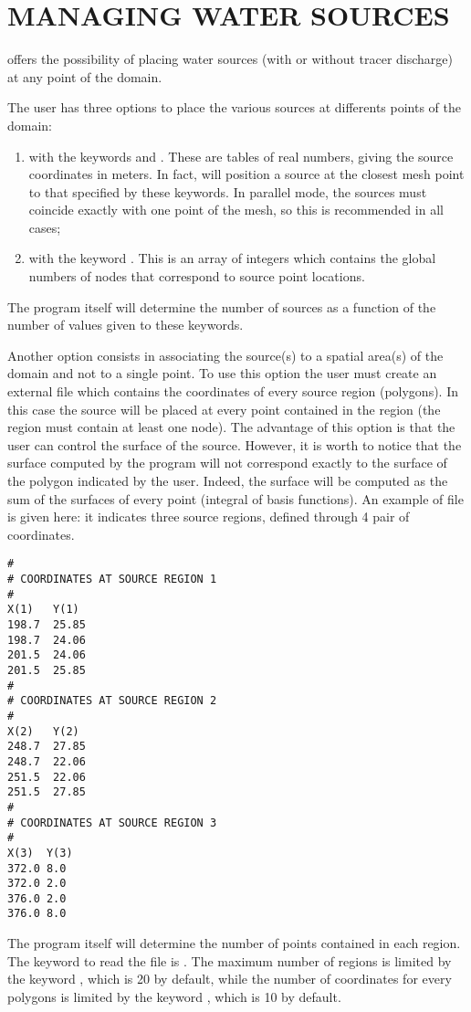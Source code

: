\chapter{MANAGING WATER SOURCES}
\label{ch:manag:ws}
 offers the possibility of placing water sources (with or without
tracer discharge) at any point of the domain.

The user has three options to place the various sources at differents points
of the domain:
\begin{enumerate}
\item with the keywords  and
.
These are tables of real numbers,
giving the source coordinates in meters. In fact,  will position a
source at the closest mesh point to that specified by these keywords.
In parallel mode, the sources must coincide exactly with one point of the mesh,
so this is recommended in all cases;
\item with the keyword . This is an
array of integers which contains the global numbers of nodes that correspond
 to source point locations.
\end{enumerate}
The program itself will determine the number of sources as a function of the
number of values given to these keywords.

Another option consists in associating the source(s) to a spatial area(s) of the
domain and not to a single point.
To use this option the user must create an external file which contains the coordinates
of every source region (polygons).
In this case the source will be placed at every point contained in the
region (the region must contain at least one node). The advantage of this option
is that the user can control the surface of the source. However, it is worth to
notice that the surface computed by the program will not correspond exactly to the
surface of the polygon indicated by the user. Indeed, the surface will be computed as
the sum of the surfaces of every point (integral of basis functions).
An example of file is given here: it indicates three source regions, defined
through 4 pair of coordinates.
\begin{lstlisting}[language=TelemacCas]
#
# COORDINATES AT SOURCE REGION 1
#
X(1)   Y(1)
198.7  25.85
198.7  24.06
201.5  24.06
201.5  25.85
#
# COORDINATES AT SOURCE REGION 2
#
X(2)   Y(2)
248.7  27.85
248.7  22.06
251.5  22.06
251.5  27.85
#
# COORDINATES AT SOURCE REGION 3
#
X(3)  Y(3)
372.0 8.0
372.0 2.0
376.0 2.0
376.0 8.0
\end{lstlisting}
The program itself will determine the number of points contained in each region.
The keyword to read the file is .
The maximum number of regions is limited by the keyword
, which is 20 by default, while the number
of coordinates for every polygons is limited by the keyword
, which is 10 by default.

